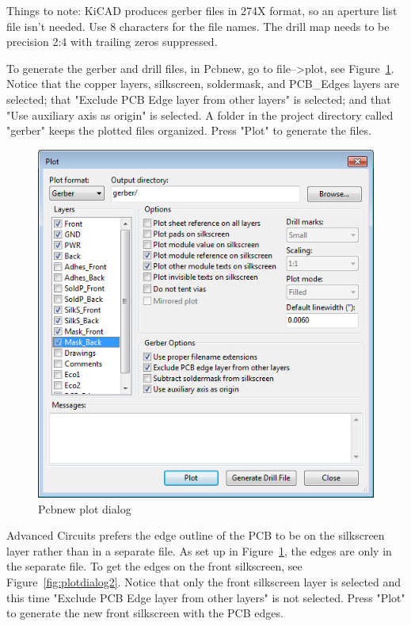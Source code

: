 Things to note: KiCAD produces gerber files in 274X format, so an aperture list file isn't needed.  Use 8 characters for the file names.  The drill map needs to be precision 2:4 with trailing zeros suppressed.

To generate the gerber and drill files, in Pcbnew, go to file-->plot, see Figure~\ref{fig:plotdialog1}.  Notice that the copper layers, silkscreen, soldermask, and PCB\_Edges layers are selected; that "Exclude PCB Edge layer from other layers" is selected; and that "Use auxiliary axis as origin" is selected.  A folder in the project directory called "gerber" keeps the plotted files organized.  Press "Plot" to generate the files.

\begin{figure}[H]
	\centering 
		\includegraphics{./figures/plotdialog1} 
	\caption{Pcbnew plot dialog\label{fig:plotdialog1}}
\end{figure}

Advanced Circuits prefers the edge outline of the PCB to be on the silkscreen layer rather than in a separate file.  As set up in Figure~\ref{fig:plotdialog1}, the edges are only in the separate file.  To get the edges on the front silkscreen, see  Figure~\ref{fig:plotdialog2}.  Notice that only the front silkscreen layer is selected and this time "Exclude PCB Edge layer from other layers" is not selected. Press "Plot" to generate the new front silkscreen with the PCB edges.


